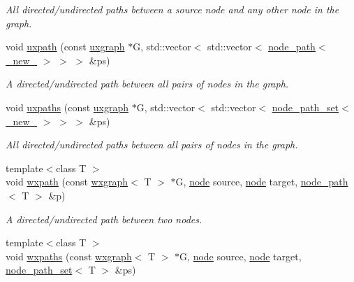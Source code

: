 \begin{DoxyCompactItemize}
\begin{DoxyCompactList}\small\item\em All directed/undirected paths between a source node and any other node in the graph. \end{DoxyCompactList}\item 
void \hyperlink{namespacelgraph_1_1traversal_a84e2456a95f432086b4179342bbf7a0f}{uxpath} (const \hyperlink{classlgraph_1_1uxgraph}{uxgraph} $\ast$G, std\+::vector$<$ std\+::vector$<$ \hyperlink{classlgraph_1_1node__path}{node\+\_\+path}$<$ \hyperlink{namespacelgraph_a2836f966c1c36b43da337d8907728ec0}{\+\_\+new\+\_\+} $>$ $>$ $>$ \&ps)
\begin{DoxyCompactList}\small\item\em A directed/undirected path between all pairs of nodes in the graph. \end{DoxyCompactList}\item 
void \hyperlink{namespacelgraph_1_1traversal_a26efdc24fea2108a7c1a4a138356b236}{uxpaths} (const \hyperlink{classlgraph_1_1uxgraph}{uxgraph} $\ast$G, std\+::vector$<$ std\+::vector$<$ \hyperlink{namespacelgraph_a0570ce57129123d5816913d287f6cc73}{node\+\_\+path\+\_\+set}$<$ \hyperlink{namespacelgraph_a2836f966c1c36b43da337d8907728ec0}{\+\_\+new\+\_\+} $>$ $>$ $>$ \&ps)
\begin{DoxyCompactList}\small\item\em All directed/undirected paths between all pairs of nodes in the graph. \end{DoxyCompactList}\item 
{\footnotesize template$<$class T $>$ }\\void \hyperlink{namespacelgraph_1_1traversal_acb255be04a53f1d3863f7beaeda2dde0}{wxpath} (const \hyperlink{classlgraph_1_1wxgraph}{wxgraph}$<$ T $>$ $\ast$G, \hyperlink{namespacelgraph_a397169dd66adf725210a30fb7251773e}{node} source, \hyperlink{namespacelgraph_a397169dd66adf725210a30fb7251773e}{node} target, \hyperlink{classlgraph_1_1node__path}{node\+\_\+path}$<$ T $>$ \&p)
\begin{DoxyCompactList}\small\item\em A directed/undirected path between two nodes. \end{DoxyCompactList}\item 
{\footnotesize template$<$class T $>$ }\\void \hyperlink{namespacelgraph_1_1traversal_a97b92a041fa93b26f26d60d11f717dc5}{wxpaths} (const \hyperlink{classlgraph_1_1wxgraph}{wxgraph}$<$ T $>$ $\ast$G, \hyperlink{namespacelgraph_a397169dd66adf725210a30fb7251773e}{node} source, \hyperlink{namespacelgraph_a397169dd66adf725210a30fb7251773e}{node} target, \hyperlink{namespacelgraph_a0570ce57129123d5816913d287f6cc73}{node\+\_\+path\+\_\+set}$<$ T $>$ \&ps)

\end{DoxyCompactItemize}
